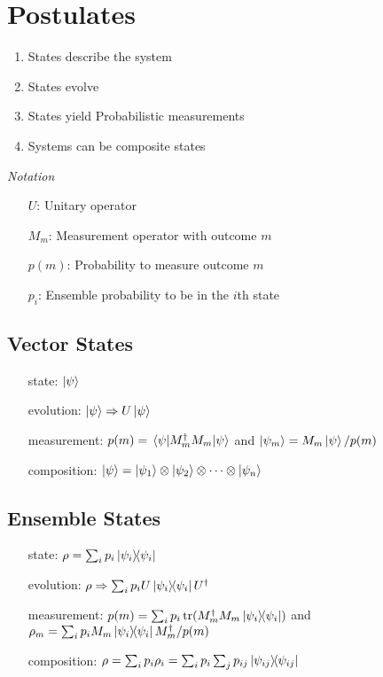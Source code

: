 \section*{Postulates}
\begin{enumerate}
\item States describe the system
\item States evolve
\item States yield Probabilistic measurements
\item Systems can be composite states
\end{enumerate}
\emph{Notation}
\begin{itemize}
\item [$U$:] Unitary operator
\item [$M_m$:] Measurement operator with outcome $m$
\item [$p(m)$:] Probability to measure outcome $m$
\item [$p_i$:] Ensemble probability to be in the $i$th state
\end{itemize}



\subsection*{Vector States}
\begin{itemize}
\item [state:] $\ket{\psi}$
\item [evolution:] $\ket{\psi} \Rightarrow U\ket{\psi}$
\item [measurement:] $p(m) = \expectationvalue{M^\dagger_m M_m}{\psi}$ and
  $\ket{\psi_m} = M_m\ket{\psi} / p(m)$
\item [composition:] $\ket{\psi} = \ket{\psi_1} \otimes \ket{\psi_2} \otimes
  \dotsm \otimes \ket{\psi_n}$
\end{itemize}
\subsection*{Ensemble States}
\begin{itemize}
\item [state:] $\rho = \sum_i p_i\outerproduct{\psi_i}$
\item [evolution:] $\rho \Rightarrow \sum_i p_iU\outerproduct{\psi_i}U^\dagger$
\item [measurement:] $p(m) = \sum_i p_i \trace(M^\dagger_m M_m\outerproduct{\psi_i})$ and
  $\rho_m = \sum_i p_i M_m\outerproduct{\psi_i} M_m^\dagger/ p(m)$
\item [composition:] $\rho = \sum_i p_i \rho_i = \sum_i p_i \sum_j p_{ij}\outerproduct{\psi_{ij}}$
\end{itemize}
